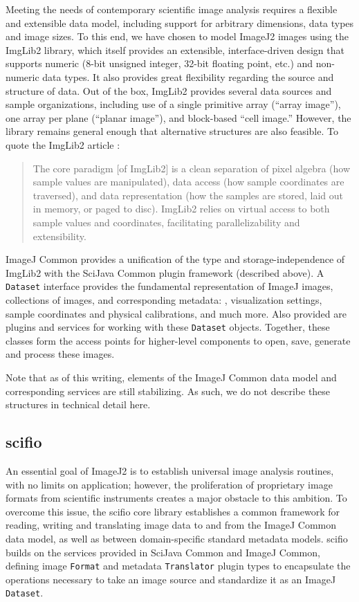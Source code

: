 \documentclass{bmcart}
\begin{document}
Meeting the needs of contemporary scientific image analysis requires a flexible
and extensible data model, including support for arbitrary dimensions, data
types and image sizes. To this end, we have chosen to model ImageJ2 images
using the ImgLib2 library, which itself provides an extensible,
interface-driven design that supports numeric (8-bit unsigned integer, 32-bit
floating point, etc.) and non-numeric data types. It also provides great
flexibility regarding the source and structure of data. Out of the box, ImgLib2
provides several data sources and sample organizations, including use of a
single primitive array (``array image''), one array per plane (``planar
image''), and block-based ``cell image.'' However, the library remains general
enough that alternative structures are also feasible. To quote the ImgLib2
article \cite{imglib2}:

\begin{quote}
  The core paradigm [of ImgLib2] is a clean separation of pixel algebra (how
  sample values are manipulated), data access (how sample coordinates are
  traversed), and data representation (how the samples are stored, laid out in
  memory, or paged to disc). ImgLib2 relies on virtual access to both sample
  values and coordinates, facilitating parallelizability and extensibility.
\end{quote}

ImageJ Common provides a unification of the type and storage-independence of
ImgLib2 with the SciJava Common plugin framework (described above). A
\texttt{Dataset} interface provides the fundamental representation of ImageJ
images, collections of images, and corresponding metadata: ,
visualization settings, sample coordinates and physical calibrations, and much
more. Also provided are plugins and services for working with these
\texttt{Dataset} objects. Together, these classes form the access points for
higher-level components to open, save, generate and process these images.

Note that as of this writing, elements of the ImageJ Common data model and
corresponding services are still stabilizing. As such, we do not describe these
structures in technical detail here.

\subsection*{\acrshort{scifio}} An essential goal of ImageJ2 is to establish
universal image analysis routines, with no limits on application; however, the
proliferation of proprietary image formats from scientific instruments creates
a major obstacle to this ambition. To overcome this issue, the
\acrshort{scifio} core library establishes a common framework for reading,
writing and translating image data to and from the ImageJ Common data model, as
well as between domain-specific standard metadata models. \acrshort{scifio}
builds on the services provided in SciJava Common and ImageJ Common, defining
image \texttt{Format} and metadata \texttt{Translator} plugin types to
encapsulate the operations necessary to take an image source and standardize it
as an ImageJ \texttt{Dataset}.
\end{document}
